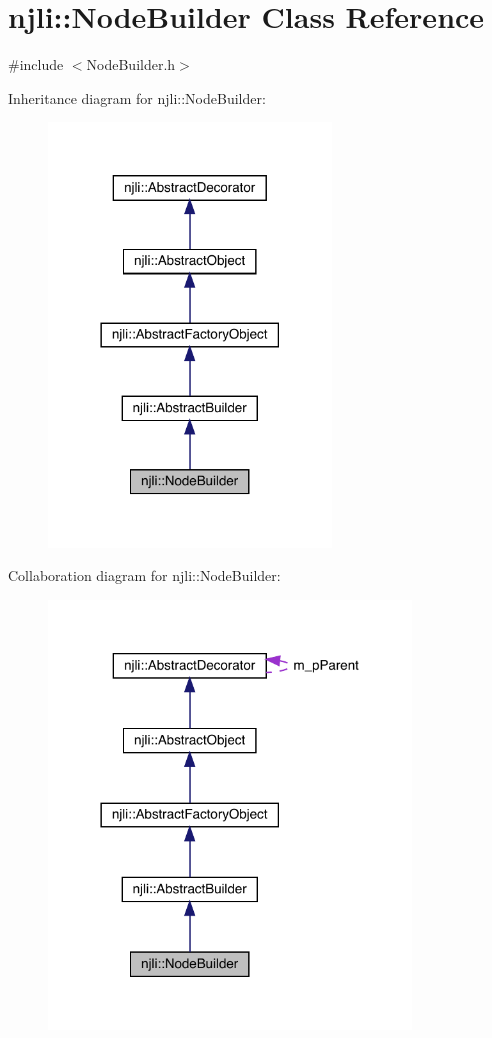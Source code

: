 \hypertarget{classnjli_1_1_node_builder}{}\section{njli\+:\+:Node\+Builder Class Reference}
\label{classnjli_1_1_node_builder}


{\ttfamily \#include $<$Node\+Builder.\+h$>$}



Inheritance diagram for njli\+:\+:Node\+Builder\+:\nopagebreak
\begin{figure}[H]
\begin{center}
\leavevmode
\includegraphics[width=213pt]{classnjli_1_1_node_builder__inherit__graph}
\end{center}
\end{figure}


Collaboration diagram for njli\+:\+:Node\+Builder\+:\nopagebreak
\begin{figure}[H]
\begin{center}
\leavevmode
\includegraphics[width=273pt]{classnjli_1_1_node_builder__coll__graph}
\end{center}
\end{figure}
